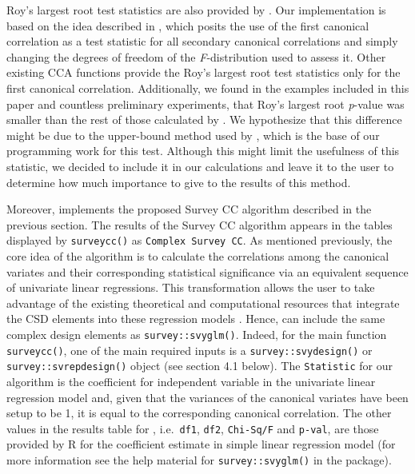 Roy's largest root test statistics are also provided by . Our implementation is based on the idea described in \citep{johnstone2009}, which posits the use of the first canonical correlation as a test statistic for all secondary canonical correlations and simply changing the degrees of freedom of the \emph{F}-distribution used to assess it. Other existing CCA functions provide the Roy's largest root test statistics only for the first canonical correlation. Additionally, we found in the examples included in this paper and countless preliminary experiments, that Roy's largest root \emph{p}-value was smaller than the rest of those calculated by . We hypothesize that this difference might be due to the upper-bound method used by \cite{johnstone2009}, which is the base of our programming work for this test. Although this might limit the usefulness of this statistic, we decided to include it in our calculations and leave it to the user to determine how much importance to give to the results of this method.

Moreover,  implements the proposed Survey CC algorithm described in the previous section. The results of the Survey CC algorithm appears in the tables displayed by \texttt{surveycc()} as \texttt{Complex\ Survey\ CC}. As mentioned previously, the core idea of the algorithm is to calculate the correlations among the canonical variates and their corresponding statistical significance via an equivalent sequence of univariate linear regressions. This transformation allows the user to take advantage of the existing theoretical and computational resources that integrate the CSD elements into these regression models \citep{val2018}. Hence,  can include the same complex design elements as \texttt{survey::svyglm()}. Indeed, for the main function \texttt{surveycc()}, one of the main required inputs is a \texttt{survey::svydesign()} or \texttt{survey::svrepdesign()} object (see section 4.1 below). The \texttt{Statistic} for our algorithm is the coefficient for independent variable in the univariate linear regression model and, given that the variances of the canonical variates have been setup to be 1, it is equal to the corresponding canonical correlation. The other values in the results table for , i.e.~\texttt{df1}, \texttt{df2}, \texttt{Chi-Sq/F} and \texttt{p-val}, are those provided by R for the coefficient estimate in simple linear regression model (for more information see the help material for \texttt{survey::svyglm()} in the  package).

